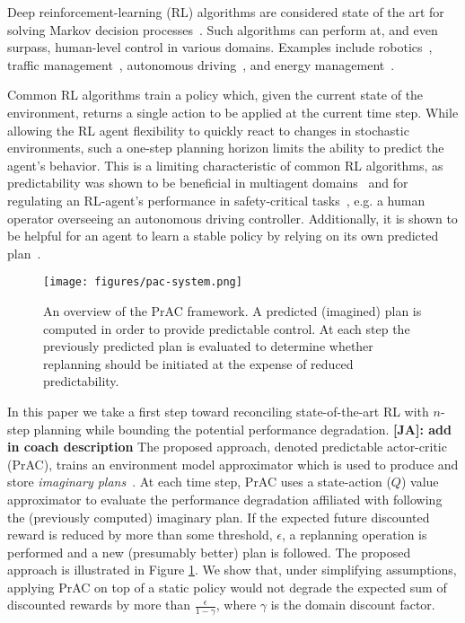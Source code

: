\documentclass[letterpaper]{article} %
\newcommand{\JA}[1] {{\color{red} \textbf{[JA]: #1}}}
\begin{document}
Deep reinforcement-learning (RL) algorithms are considered state of the art for solving Markov decision processes~\cite{haarnoja2018soft,schulman2017proximal,mnih2015human}. Such algorithms can perform at, and even surpass, human-level control in various domains. Examples include robotics~\cite{haarnoja2018soft,dey2021jirl}, traffic management~\cite{Ault2021signals,ault2020learning}, autonomous driving~\cite{8793742,sallab2017deep}, and energy management~\cite{gao2014machine,vandael2015reinforcement}. 

Common RL algorithms train a policy which, given the current state of the environment, returns a single action to be applied at the current time step. While allowing the RL agent flexibility to quickly react to changes in stochastic environments, such a one-step planning horizon limits the ability to predict the agent's behavior. This is a limiting characteristic of common RL algorithms, as predictability was shown to be beneficial in multiagent domains~\cite{wen2019probabilistic,sun2018probabilistic,kim2020communication,das2019tarmac,raileanu2018modeling} and for regulating an RL-agent's performance in safety-critical tasks~\cite{8897630}, e.g. a human operator overseeing an autonomous driving controller. Additionally, it is shown to be helpful for an agent to learn a stable policy by relying on its own predicted plan~\cite{racaniere2017imagination}.

\begin{figure}
    \texttt{[image: figures/pac-system.png]}
    \caption{An overview of the PrAC framework. A predicted (imagined) plan is computed in order to provide predictable control. At each step the previously predicted plan is evaluated to determine whether replanning should be initiated at the expense of reduced predictability.}
    \label{pac-system}
\end{figure}

In this paper we take a first step toward reconciling state-of-the-art RL with $n$-step planning while bounding the potential performance degradation. \JA{add in coach description}
The proposed approach, denoted predictable actor-critic (PrAC), trains an environment model approximator which is used to produce and store \textit{imaginary plans}~\cite{racaniere2017imagination}. At each time step, PrAC uses a state-action ($Q$) value approximator to evaluate the performance degradation affiliated with following the (previously computed) imaginary plan. If the expected future discounted reward is reduced by more than some threshold, $\epsilon$, a replanning operation is performed and a new (presumably better) plan is followed. The proposed approach is illustrated in Figure \ref{pac-system}.  We show that, under simplifying assumptions, applying PrAC on top of a static policy would not degrade the expected sum of discounted rewards by more than $\frac{\epsilon}{1-\gamma}$, where $\gamma$ is the domain discount factor.
\end{document}
